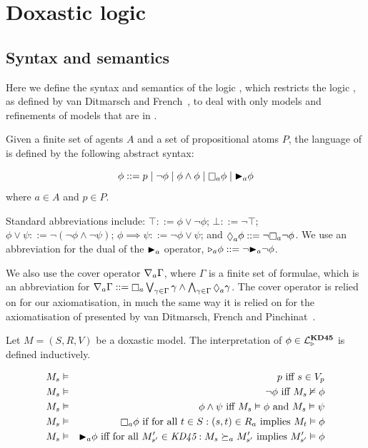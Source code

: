 \chapter{Doxastic logic}

\section{Syntax and semantics}

Here we define the syntax and semantics of the logic \logicKDF{}, which
restricts the logic \logicK{}, as defined by van Ditmarsch and
French~\cite{french2009simulation}, to deal with only models and refinements of
models that are in \classKD{}.

\begin{definition}
Given a finite set of agents $A$ and a set of propositional atoms $P$, the
language of \langF{} is defined by the following abstract syntax:

$$
\phi ::=    p \bnfalt
            \neg \phi \bnfalt
            \phi \land \phi \bnfalt
            \knows_a \phi \bnfalt
            \allrefs_a \phi
$$
where $a \in A$ and $p \in P$.
\end{definition}

Standard abbreviations include:
$\top ::= \phi \lor \neg \phi$;
$\bot ::= \neg \top$;
$\phi \lor \psi ::= \neg (\neg \phi \land \neg \psi)$;
$\phi \implies \psi ::= \neg \phi \lor \psi$;
and $\suspects_a \phi ::= \neg \knows_a \neg \phi$.
We use an abbreviation for the dual of the ${\mathopen{\blacktriangleright}}_a$ operator,
${\mathopen{\triangleright}}_a \phi ::= \neg {\ensuremath{\mathopen{\blacktriangleright}}}_a \neg \phi$.

We also use the cover operator $\nabla_a \Gamma$, where $\Gamma$ is a finite
set of formulae, which is an abbreviation for 
$\covers_a \Gamma ::= \knows_a \bigvee_{\gamma \in \Gamma} \gamma \land
\bigwedge_{\gamma \in \Gamma} \suspects_a \gamma$. The cover operator is relied
on for our axiomatisation, in much the same way it is relied on for the
axiomatisation of \logicKiF{} presented by van Ditmarsch, French and
Pinchinat~\cite{french2010future}.

\begin{definition}
Let $M = (S, R, V)$ be a doxastic model. The interpretation of $\phi \in
\mathcal{L}^{\mathbf{KD45}}_{\mathopen{\triangleright}}$ is defined inductively.

\begin{eqnarray*}
M_s &\entails& p \text{ iff } s \in V_p\\
M_s &\entails& \neg \phi \text{ iff } M_s \nentails \phi\\
M_s &\entails& \phi \land \psi \text{ iff } M_s \entails \phi \text{ and } M_s
\entails \psi\\
M_s &\entails& \knows_a \phi \text{ if for all } t \in S : (s, t) \in R_a \text{
implies } M_t \entails \phi\\
M_s &\entails& \allrefs_a \phi \text{ iff for all } M'_{s'} \in \classKD : M_s
\simulation_a M'_{s'} \text{ implies } M'_{s'} \entails \phi\\
\end{eqnarray*}
\end{definition}

